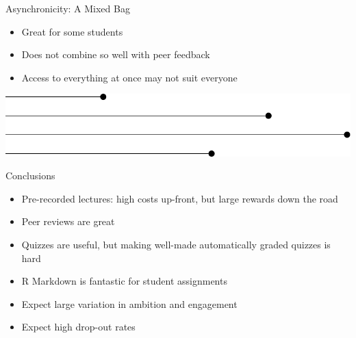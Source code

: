 \begin{frame}{Asynchronicity: A Mixed Bag}
  \begin{itemize}
    \item Great for some students
    \item Does not combine so well with peer feedback
    \item Access to everything at once may not suit everyone
  \end{itemize}
  \vspace{15ex}
  \begin{center}
    \includegraphics[width=0.7\linewidth]{figures/async.pdf}
  \end{center}
\end{frame}

\begin{frame}{Conclusions}
  \begin{itemize}
    \item Pre-recorded lectures: high costs up-front, but large rewards down
       the road
    \item Peer reviews are great
    \item Quizzes are useful, but making well-made automatically graded quizzes
          is hard
    \item R Markdown is fantastic for student assignments
    \item Expect large variation in ambition and engagement
    \item Expect high drop-out rates
  \end{itemize}
\end{frame}



